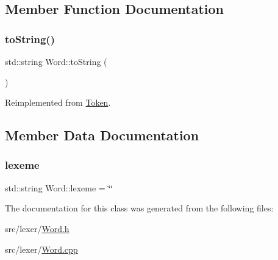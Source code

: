 \subsection{Member Function Documentation}
\mbox{\label{class_word_a950a81bfd0fc369b0eb8d0d6b27e2870}} 
\subsubsection{\texorpdfstring{to\+String()}{toString()}}
{\footnotesize\ttfamily std\+::string Word\+::to\+String (\begin{DoxyParamCaption}{ }\end{DoxyParamCaption})\hspace{0.3cm}{\ttfamily [virtual]}}



Reimplemented from \hyperlink{class_token_a8863381edabce7bc1e92473b445ba81f}{Token}.



\subsection{Member Data Documentation}
\mbox{\label{class_word_a34691d869ec57b2a0b7a8eb41230b92a}} 
\subsubsection{\texorpdfstring{lexeme}{lexeme}}
{\footnotesize\ttfamily std\+::string Word\+::lexeme = \char`\"{}\char`\"{}}



The documentation for this class was generated from the following files\+:\begin{DoxyCompactItemize}
\item 
src/lexer/\hyperlink{_word_8h}{Word.\+h}\item 
src/lexer/\hyperlink{_word_8cpp}{Word.\+cpp}\end{DoxyCompactItemize}
